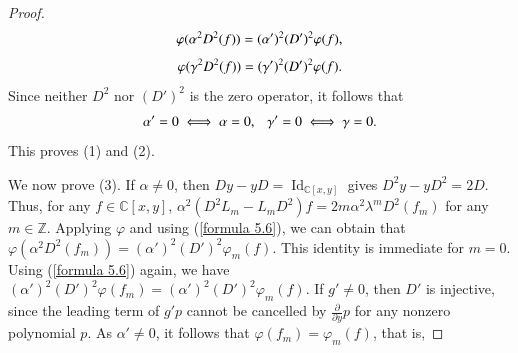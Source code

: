\documentclass[12pt,reqno]{amsart}
\def\Z{\mathbb{Z}}
\def\C{\mathbb{C}}
\numberwithin{equation}{section}
\begin{document}
\begin{proof}
 \begin{equation}\label{formula 5.6}
\aligned
\varphi(\alpha^2D^2(f))=(\alpha')^2(D')^2\varphi(f),
\endaligned
\end{equation}
 \begin{equation*}\label{formula 6.2.4.2}
\aligned
\varphi(\gamma^2D^2(f))=(\gamma')^2(D')^2\varphi(f).
\endaligned
\end{equation*}
Since neither $D^2$ nor $(D')^2$ is the zero operator, it follows that
\begin{equation}\label{formula 5.12}
\aligned
\alpha'=0\iff \alpha=0,\ \ \ \gamma'=0\iff\gamma=0.
\endaligned
\end{equation}
This proves (1) and (2).
  
We now prove (3). If $\alpha\ne 0$, then $Dy-yD=\operatorname{Id}_{\C[x,y]}$ gives $D^2y-yD^2=2D$. Thus, for any $f\in\C[x,y]$, $\alpha^2(D^2L_m-L_mD^2)f=2m\alpha^2\lambda^mD^2(f_m )$
for any $m\in\Z$. 
Applying $\varphi$ and using (\ref{formula 5.6}), 
we can obtain that $\varphi(\alpha^2D^2(f_m))=(\alpha')^2(D')^2\varphi_m(f).$
This identity is immediate for $m=0$. Using (\ref{formula 5.6}) again, we have
$(\alpha')^2(D')^2\varphi(f_m)=(\alpha')^2(D')^2\varphi_m(f).$
If $g'\ne0$, then $D'$ is injective, since the leading term of $g'p$ cannot be cancelled by $\frac{\partial}{\partial{y}}p$ for any nonzero polynomial $p$. As $\alpha'\ne0$, it follows that $\varphi(f_m)=\varphi_m(f)$, that is,

\end{proof}
\end{document}
